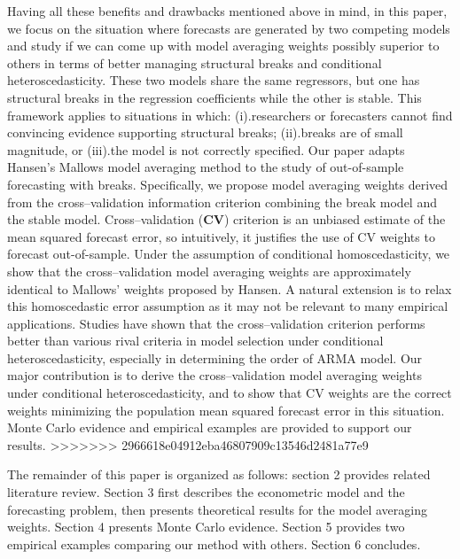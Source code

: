 Having all these benefits and drawbacks mentioned above in mind, in this paper, we focus on the situation where forecasts are generated by two competing models and study if we can come up with model averaging weights possibly superior to others in terms of better managing structural breaks and conditional heteroscedasticity. These two models share the same regressors, but one has structural breaks in the regression coefficients while the other is stable. This framework applies to situations in which: (i).researchers or forecasters cannot find convincing evidence supporting structural breaks; (ii).breaks are of small magnitude, or (iii).the model is not correctly specified. Our paper adapts Hansen's Mallows model averaging method \cite{hansen2009averaging} to the study of out-of-sample forecasting with breaks. Specifically, we propose model averaging weights derived from the cross--validation information criterion combining the break model and the stable model. Cross--validation (\textbf{CV}) criterion is an unbiased estimate of the mean squared forecast error, so intuitively, it justifies the use of CV weights to forecast out-of-sample. Under the assumption of conditional homoscedasticity, we show that the cross--validation model averaging weights are approximately identical to Mallows' weights proposed by Hansen. A natural extension is to relax this homoscedastic error assumption as it may not be relevant to many empirical applications. Studies have shown that the cross--validation criterion performs better than various rival criteria in model selection under conditional heteroscedasticity, especially in determining the order of ARMA model. Our major contribution is to derive the cross--validation model averaging weights under conditional heteroscedasticity, and to show that CV weights are the correct weights minimizing the population mean squared forecast error in this situation. Monte Carlo evidence and empirical examples are provided to support our results.
>>>>>>> 2966618e04912eba46807909c13546d2481a77e9

The remainder of this paper is organized as follows: section 2 provides related literature review. Section 3 first describes the econometric model and the forecasting problem, then presents theoretical results for the model averaging weights. Section 4 presents Monte Carlo evidence. Section 5 provides two empirical examples comparing our method with others. Section 6 concludes. 